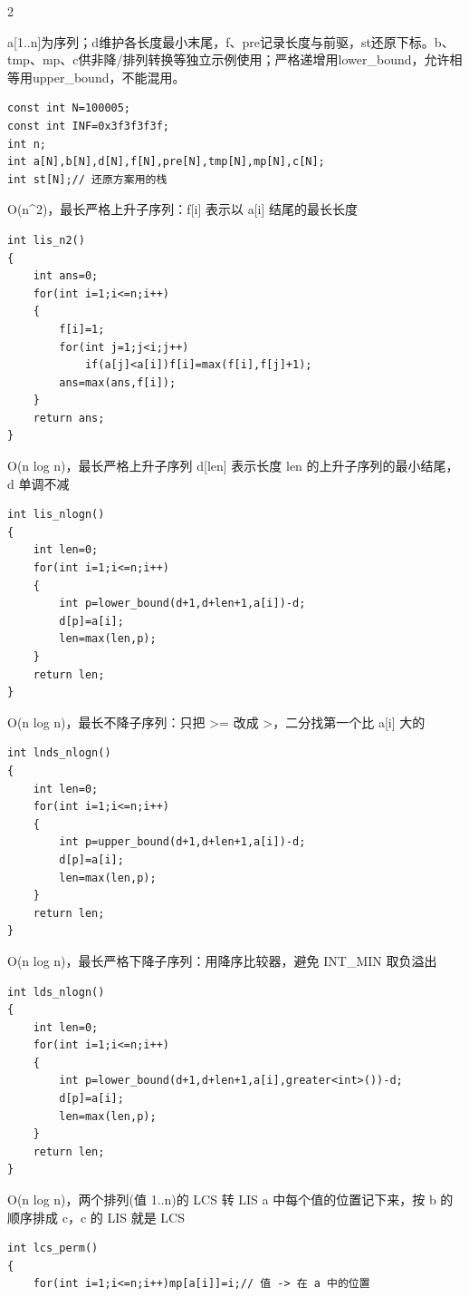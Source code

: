 \documentclass[UTF8,fontset=fandol,a4paper,twoside]{ctexart}
\newcommand{\note}[1]{{\fontsize{10}{12}\selectfont #1\par}}
\begin{document}
\begin{multicols}{2}
\note{a[\allowbreak{}1.\allowbreak{}.\allowbreak{}n]\allowbreak{}为序列；d维护各长度最小末尾，f、pre记录长度与前驱，st还原下标。b、tmp、mp、c供非降/\allowbreak{}排列转换等独立示例使用；严格递增用lower\_bound，允许相等用upper\_bound，不能混用。}
\begin{lstlisting}
const int N=100005;
const int INF=0x3f3f3f3f;
int n;
int a[N],b[N],d[N],f[N],pre[N],tmp[N],mp[N],c[N];
int st[N];// 还原方案用的栈
\end{lstlisting}
\note{O(\allowbreak{}n\textasciicircum{}2)\allowbreak{}，最长严格上升子序列：f[\allowbreak{}i]\allowbreak{} 表示以 a[\allowbreak{}i]\allowbreak{} 结尾的最长长度}
\begin{lstlisting}
int lis_n2()
{
    int ans=0;
    for(int i=1;i<=n;i++)
    {
        f[i]=1;
        for(int j=1;j<i;j++)
            if(a[j]<a[i])f[i]=max(f[i],f[j]+1);
        ans=max(ans,f[i]);
    }
    return ans;
}
\end{lstlisting}
\note{O(\allowbreak{}n log n)\allowbreak{}，最长严格上升子序列 d[\allowbreak{}len]\allowbreak{} 表示长度 len 的上升子序列的最小结尾，d 单调不减}
\begin{lstlisting}
int lis_nlogn()
{
    int len=0;
    for(int i=1;i<=n;i++)
    {
        int p=lower_bound(d+1,d+len+1,a[i])-d;
        d[p]=a[i];
        len=max(len,p);
    }
    return len;
}
\end{lstlisting}
\note{O(\allowbreak{}n log n)\allowbreak{}，最长不降子序列：只把 >\allowbreak{}=\allowbreak{} 改成 >\allowbreak{}，二分找第一个比 a[\allowbreak{}i]\allowbreak{} 大的}
\begin{lstlisting}
int lnds_nlogn()
{
    int len=0;
    for(int i=1;i<=n;i++)
    {
        int p=upper_bound(d+1,d+len+1,a[i])-d;
        d[p]=a[i];
        len=max(len,p);
    }
    return len;
}
\end{lstlisting}
\note{O(\allowbreak{}n log n)\allowbreak{}，最长严格下降子序列：用降序比较器，避免 INT\_MIN 取负溢出}
\begin{lstlisting}
int lds_nlogn()
{
    int len=0;
    for(int i=1;i<=n;i++)
    {
        int p=lower_bound(d+1,d+len+1,a[i],greater<int>())-d;
        d[p]=a[i];
        len=max(len,p);
    }
    return len;
}
\end{lstlisting}
\note{O(\allowbreak{}n log n)\allowbreak{}，两个排列(\allowbreak{}值 1.\allowbreak{}.\allowbreak{}n)\allowbreak{}的 LCS 转 LIS a 中每个值的位置记下来，按 b 的顺序排成 c，c 的 LIS 就是 LCS}
\begin{lstlisting}
int lcs_perm()
{
    for(int i=1;i<=n;i++)mp[a[i]]=i;// 值 -> 在 a 中的位置

\end{lstlisting}
\end{multicols}
\end{document}
